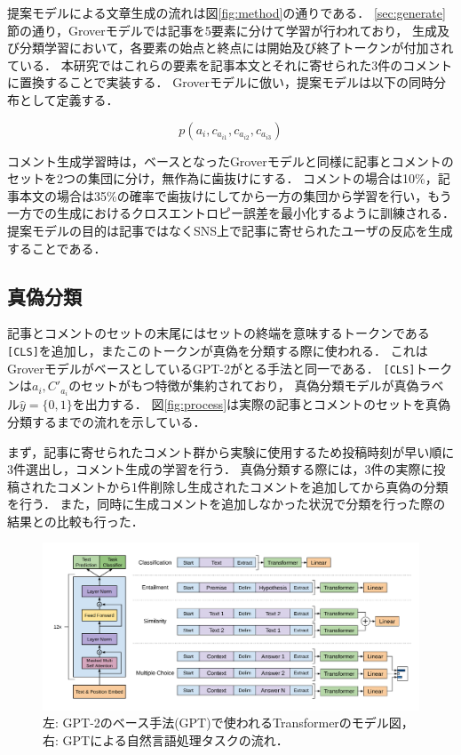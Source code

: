 提案モデルによる文章生成の流れは図\ref{fig:method}の通りである．
\ref{sec:generate}節の通り，Groverモデルでは記事を5要素に分けて学習が行われており，
生成及び分類学習において，各要素の始点と終点には開始及び終了トークンが付加されている．
本研究ではこれらの要素を記事本文とそれに寄せられた3件のコメントに置換することで実装する．
Groverモデルに倣い，提案モデルは以下の同時分布として定義する．

\begin{equation}
    \label{eq:joint_distri}
    p(a_i, c_{a_{i1}}, c_{a_{i2}}, c_{a_{i3}})
\end{equation}

コメント生成学習時は，ベースとなったGroverモデルと同様に記事とコメントのセットを2つの集団に分け，無作為に歯抜けにする．
コメントの場合は10\%，記事本文の場合は35\%の確率で歯抜けにしてから一方の集団から学習を行い，もう一方での生成におけるクロスエントロピー誤差を最小化するように訓練される\cite{DBLP:journals/corr/abs-1905-12616}．
提案モデルの目的は記事ではなくSNS上で記事に寄せられたユーザの反応を生成することである．

\subsection{真偽分類}
\label{sec:method_classify}
記事とコメントのセットの末尾にはセットの終端を意味するトークンである\texttt{[CLS]}を追加し，またこのトークンが真偽を分類する際に使われる．
これはGroverモデルがベースとしているGPT-2がとる手法\cite{Radford_GPT2}と同一である．
\texttt{[CLS]}トークンは${a_i, C'_{a_i}}$のセットがもつ特徴が集約されており，
真偽分類モデルが真偽ラベル$\hat{y} = \{0, 1\}$を出力する．
図\ref{fig:process}は実際の記事とコメントのセットを真偽分類するまでの流れを示している．

まず，記事に寄せられたコメント群から実験に使用するため投稿時刻が早い順に3件選出し，コメント生成の学習を行う．
真偽分類する際には，3件の実際に投稿されたコメントから1件削除し生成されたコメントを追加してから真偽の分類を行う．
また，同時に生成コメントを追加しなかった状況で分類を行った際の結果との比較も行った．

\begin{figure}[p]
    \centering
    \includegraphics[width=\linewidth,pagebox=cropbox,clip]{figures/fig_gpt.pdf}
    \caption{左: GPT-2のベース手法(GPT)で使われるTransformerのモデル図，右: GPTによる自然言語処理タスクの流れ\cite{radford2018improving}．}
    \label{fig:gpt}
\end{figure}

